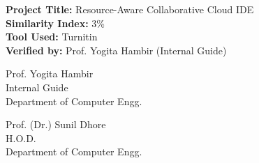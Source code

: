 \documentclass[12pt,a4paper]{report}
\begin{document}
		\textbf{Project Title:} Resource-Aware Collaborative Cloud IDE \\
		\textbf{Similarity Index:} 3\% \\
		\textbf{Tool Used:} Turnitin \\
		\textbf{Verified by:} Prof. Yogita Hambir (Internal Guide)
		
		\vfill
		\noindent
		\begin{minipage}[t]{0.48\textwidth}
			Prof. Yogita Hambir \\
			Internal Guide \\
			Department of Computer Engg.
		\end{minipage}
		\hfill
		\begin{minipage}[t]{0.48\textwidth}
			\raggedleft
			Prof. (Dr.) Sunil Dhore \\
			H.O.D. \\
			Department of Computer Engg.
		\end{minipage}
		\vspace{0.8cm}
		
		
\end{document}
